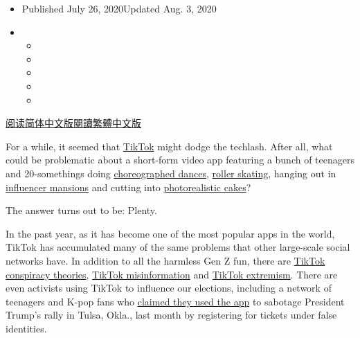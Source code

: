 \begin{itemize}
\item
  Published July 26, 2020Updated Aug. 3, 2020
\item
  \begin{itemize}
  \item
  \item
  \item
  \item
  \item
  \end{itemize}
\end{itemize}

\href{https://cn.nytimes3xbfgragh.onion/technology/20200728/tiktok-china-ban-model/}{阅读简体中文版}\href{https://cn.nytimes3xbfgragh.onion/technology/20200728/tiktok-china-ban-model/zh-hant/}{閱讀繁體中文版}

For a while, it seemed that
\href{https://www.nytimes3xbfgragh.onion/2020/08/01/technology/tiktok-trump-microsoft-bytedance-china-ban.html}{TikTok}
might dodge the techlash. After all, what could be problematic about a
short-form video app featuring a bunch of teenagers and 20-somethings
doing
\href{https://www.nytimes3xbfgragh.onion/2020/02/13/style/the-original-renegade.html}{choreographed
dances},
\href{https://www.buzzfeednews.com/article/laurenstrapagiel/roller-skating-is-back-tiktok-ana-coto}{roller
skating}, hanging out in
\href{https://www.nytimes3xbfgragh.onion/2020/01/03/style/hype-house-los-angeles-tik-tok.html}{influencer
mansions} and cutting into
\href{https://www.nytimes3xbfgragh.onion/2020/07/14/style/what-is-the-cake-meme.html}{photorealistic
cakes}?

The answer turns out to be: Plenty.

In the past year, as it has become one of the most popular apps in the
world, TikTok has accumulated many of the same problems that other
large-scale social networks have. In addition to all the harmless Gen Z
fun, there are
\href{https://www.nytimes3xbfgragh.onion/2020/06/29/technology/pizzagate-tiktok.html}{TikTok
conspiracy theories},
\href{https://www.rollingstone.com/culture/culture-features/tiktok-conspiracy-theories-bill-gates-microchip-vaccine-996394/}{TikTok
misinformation} and
\href{https://www.bbc.com/news/technology-53269361}{TikTok extremism}.
There are even activists using TikTok to influence our elections,
including a network of teenagers and K-pop fans who
\href{https://www.nytimes3xbfgragh.onion/2020/06/21/style/tiktok-trump-rally-tulsa.html}{claimed
they used the app} to sabotage President Trump's rally in Tulsa, Okla.,
last month by registering for tickets under false identities.


